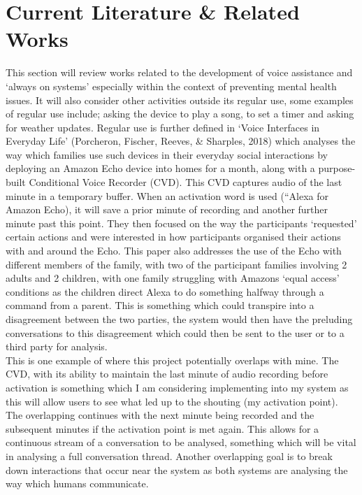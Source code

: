 \documentclass[a4paper,11pt]{report}
\begin{document}
\section{Current Literature \& Related Works}
This section will review works related to the development of voice assistance and ‘always on systems’ especially within the context of preventing mental health issues. It will also consider other activities outside its regular use, some examples of regular use include; asking the device to play a song, to set a timer and asking for weather updates. Regular use is further defined in ‘Voice Interfaces in Everyday Life’ (Porcheron, Fischer, Reeves, \& Sharples, 2018) which analyses the way which families use such devices in their everyday social interactions by deploying an Amazon Echo device into homes for a month, along with a purpose-built Conditional Voice Recorder (CVD). This CVD captures audio of the last minute in a temporary buffer. When an activation word is used (“Alexa for Amazon Echo), it will save a prior minute of recording and another further minute past this point. They then focused on the way the participants ‘requested’ certain actions and were interested in how participants organised their actions with and around the Echo. This paper also addresses the use of the Echo with different members of the family, with two of the participant families involving 2 adults and 2 children, with one family struggling with Amazons ‘equal access’ conditions as the children direct Alexa to do something halfway through a command from a parent. This is something which could transpire into a disagreement between the two parties, the system would then have the preluding conversations to this disagreement which could then be sent to the user or to a third party for analysis. \\

This is one example of where this project potentially overlaps with mine. The CVD, with its ability to maintain the last minute of audio recording before activation is something which I am considering implementing into my system as this will allow users to see what led up to the shouting (my activation point). The overlapping continues with the next minute being recorded and the subsequent minutes if the activation point is met again. This allows for a continuous stream of a conversation to be analysed, something which will be vital in analysing a full conversation thread. Another overlapping goal is to break down interactions that occur near the system as both systems are analysing the way which humans communicate.\\
\end{document}
